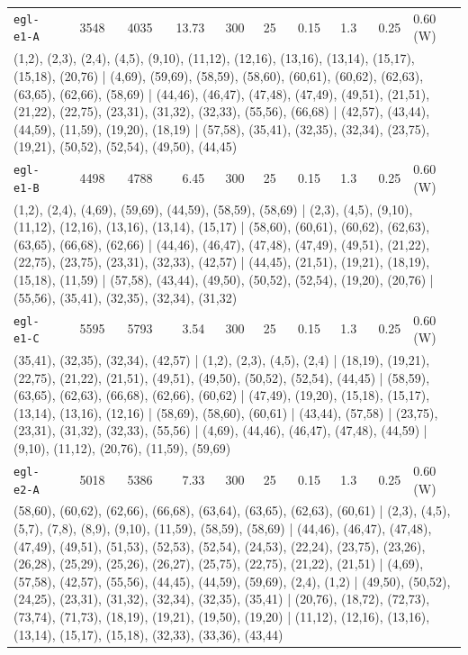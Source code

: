 \begin{longtable}{lrrrrrrrrl}
\texttt{egl-e1-A} & 3548 & 4035 & 13.73 & 300 & 25 & 0.15 & 1.3 & 0.25 & 0.60\,(W) \\
\multicolumn{10}{p{0.96\linewidth}}{\tiny\raggedright\arraybackslash (1,2), (2,3), (2,4), (4,5), (9,10), (11,12), (12,16), (13,16), (13,14), (15,17), (15,18), (20,76) | (4,69), (59,69), (58,59), (58,60), (60,61), (60,62), (62,63), (63,65), (62,66), (58,69) | (44,46), (46,47), (47,48), (47,49), (49,51), (21,51), (21,22), (22,75), (23,31), (31,32), (32,33), (55,56), (66,68) | (42,57), (43,44), (44,59), (11,59), (19,20), (18,19) | (57,58), (35,41), (32,35), (32,34), (23,75), (19,21), (50,52), (52,54), (49,50), (44,45)} \\[2pt]
\texttt{egl-e1-B} & 4498 & 4788 & 6.45 & 300 & 25 & 0.15 & 1.3 & 0.25 & 0.60\,(W) \\
\multicolumn{10}{p{0.96\linewidth}}{\tiny\raggedright\arraybackslash (1,2), (2,4), (4,69), (59,69), (44,59), (58,59), (58,69) | (2,3), (4,5), (9,10), (11,12), (12,16), (13,16), (13,14), (15,17) | (58,60), (60,61), (60,62), (62,63), (63,65), (66,68), (62,66) | (44,46), (46,47), (47,48), (47,49), (49,51), (21,22), (22,75), (23,75), (23,31), (32,33), (42,57) | (44,45), (21,51), (19,21), (18,19), (15,18), (11,59) | (57,58), (43,44), (49,50), (50,52), (52,54), (19,20), (20,76) | (55,56), (35,41), (32,35), (32,34), (31,32)} \\[2pt]
\texttt{egl-e1-C} & 5595 & 5793 & 3.54 & 300 & 25 & 0.15 & 1.3 & 0.25 & 0.60\,(W) \\
\multicolumn{10}{p{0.96\linewidth}}{\tiny\raggedright\arraybackslash (35,41), (32,35), (32,34), (42,57) | (1,2), (2,3), (4,5), (2,4) | (18,19), (19,21), (22,75), (21,22), (21,51), (49,51), (49,50), (50,52), (52,54), (44,45) | (58,59), (63,65), (62,63), (66,68), (62,66), (60,62) | (47,49), (19,20), (15,18), (15,17), (13,14), (13,16), (12,16) | (58,69), (58,60), (60,61) | (43,44), (57,58) | (23,75), (23,31), (31,32), (32,33), (55,56) | (4,69), (44,46), (46,47), (47,48), (44,59) | (9,10), (11,12), (20,76), (11,59), (59,69)} \\[2pt]
\texttt{egl-e2-A} & 5018 & 5386 & 7.33 & 300 & 25 & 0.15 & 1.3 & 0.25 & 0.60\,(W) \\
\multicolumn{10}{p{0.96\linewidth}}{\tiny\raggedright\arraybackslash (58,60), (60,62), (62,66), (66,68), (63,64), (63,65), (62,63), (60,61) | (2,3), (4,5), (5,7), (7,8), (8,9), (9,10), (11,59), (58,59), (58,69) | (44,46), (46,47), (47,48), (47,49), (49,51), (51,53), (52,53), (52,54), (24,53), (22,24), (23,75), (23,26), (26,28), (25,29), (25,26), (26,27), (25,75), (22,75), (21,22), (21,51) | (4,69), (57,58), (42,57), (55,56), (44,45), (44,59), (59,69), (2,4), (1,2) | (49,50), (50,52), (24,25), (23,31), (31,32), (32,34), (32,35), (35,41) | (20,76), (18,72), (72,73), (73,74), (71,73), (18,19), (19,21), (19,50), (19,20) | (11,12), (12,16), (13,16), (13,14), (15,17), (15,18), (32,33), (33,36), (43,44)} \\[2pt]

\end{longtable}
